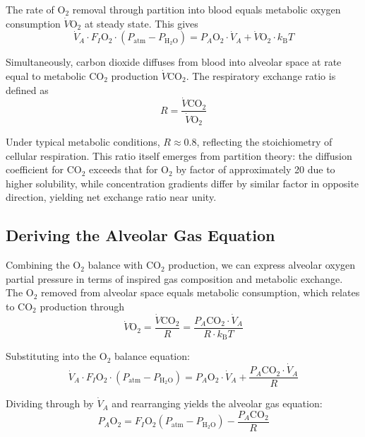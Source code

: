 \documentclass[10pt,twocolumn,a4paper]{article}
\theoremstyle{remark}
\newcommand{\kB}{k_{\mathrm{B}}}
\begin{document}
The rate of O$_{2}$ removal through partition into blood equals metabolic oxygen consumption $\dot{V}\mathrm{O}_{2}$ at steady state. This gives
\begin{equation}
\dot{V}_{A} \cdot F_{I}\mathrm{O}_{2} \cdot (P_{\mathrm{atm}} - P_{\mathrm{H}_{2}\mathrm{O}}) = P_{A}\mathrm{O}_{2} \cdot \dot{V}_{A} + \dot{V}\mathrm{O}_{2} \cdot \kB T
\end{equation}

Simultaneously, carbon dioxide diffuses from blood into alveolar space at rate equal to metabolic CO$_{2}$ production $\dot{V}\mathrm{CO}_{2}$. The respiratory exchange ratio is defined as
\begin{equation}
R = \frac{\dot{V}\mathrm{CO}_{2}}{\dot{V}\mathrm{O}_{2}}
\end{equation}

Under typical metabolic conditions, $R \approx 0.8$, reflecting the stoichiometry of cellular respiration. This ratio itself emerges from partition theory: the diffusion coefficient for CO$_{2}$ exceeds that for O$_{2}$ by factor of approximately 20 due to higher solubility, while concentration gradients differ by similar factor in opposite direction, yielding net exchange ratio near unity.

\subsection{Deriving the Alveolar Gas Equation}

Combining the O$_{2}$ balance with CO$_{2}$ production, we can express alveolar oxygen partial pressure in terms of inspired gas composition and metabolic exchange. The O$_{2}$ removed from alveolar space equals metabolic consumption, which relates to CO$_{2}$ production through
\begin{equation}
\dot{V}\mathrm{O}_{2} = \frac{\dot{V}\mathrm{CO}_{2}}{R} = \frac{P_{A}\mathrm{CO}_{2} \cdot \dot{V}_{A}}{R \cdot \kB T}
\end{equation}

Substituting into the O$_{2}$ balance equation:
\begin{equation}
\dot{V}_{A} \cdot F_{I}\mathrm{O}_{2} \cdot (P_{\mathrm{atm}} - P_{\mathrm{H}_{2}\mathrm{O}}) = P_{A}\mathrm{O}_{2} \cdot \dot{V}_{A} + \frac{P_{A}\mathrm{CO}_{2} \cdot \dot{V}_{A}}{R}
\end{equation}

Dividing through by $\dot{V}_{A}$ and rearranging yields the alveolar gas equation:
\begin{equation}
\boxed{P_{A}\mathrm{O}_{2} = F_{I}\mathrm{O}_{2}(P_{\mathrm{atm}} - P_{\mathrm{H}_{2}\mathrm{O}}) - \frac{P_{A}\mathrm{CO}_{2}}{R}}
\label{eq:alveolar_gas}
\end{equation}
\end{document}
